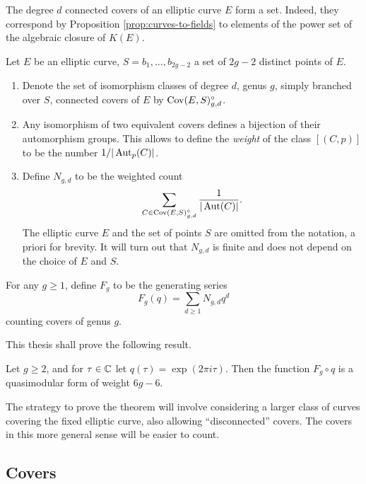 \begin{rmk}
 The degree $d$ connected covers of an elliptic curve $E$ form a set. Indeed, they correspond by Proposition \ref{prop:curves-to-fields} to elements of the power set of the algebraic closure of $K(E)$.
\end{rmk}

\begin{defi} Let $E$ be an elliptic curve, $S={b_1,\dotsc,b_{2g-2}}$ a set of $2g-2$ distinct points of $E$.
 \begin{enumerate}
  \item Denote the set of isomorphism classes of degree $d$, genus $g$, simply branched over $S$, connected covers of $E$ by $\operatorname{Cov}(E,S)^{\circ}_{g,d}$.
  
  \item Any isomorphism of two equivalent covers defines a bijection of their automorphism groups. This allows to define the \emph{weight} of the class $[(C,p)]$ to be the number $1/|\operatorname{Aut}_p(C)|$.
  
  \item Define $N_{g,d}$ to be the weighted count \[\sum_{C\in \operatorname{Cov}(E,S)^{\circ}_{g,d}} \frac{1}{|\operatorname{Aut}(C)|}.\] The elliptic curve $E$ and the set of points $S$ are omitted from the notation, a priori for brevity. It will turn out that $N_{g,d}$ is finite and does not depend on the choice of $E$ and $S$.
 \end{enumerate}
\end{defi}

\begin{defi}
 For any $g\geq 1$, define $F_g$ to be the generating series \[F_g(q)=\sum_{d\geq 1}N_{g,d}q^d\] counting covers of genus $g$.
\end{defi}

This thesis shall prove the following result.

\begin{thm}[Dijkgraaf]
 Let $g\geq 2$, and for $\tau\in\mathbb{C}$ let $q(\tau)=\exp(2\pi i\tau)$. Then the function $F_g\circ q$ is a quasimodular form of weight $6g-6$.
\end{thm}

The strategy to prove the theorem will involve considering a larger class of curves covering the fixed elliptic curve, also allowing ``disconnected'' covers. The covers in this more general sense will be easier to count.

\subsection{Covers}

